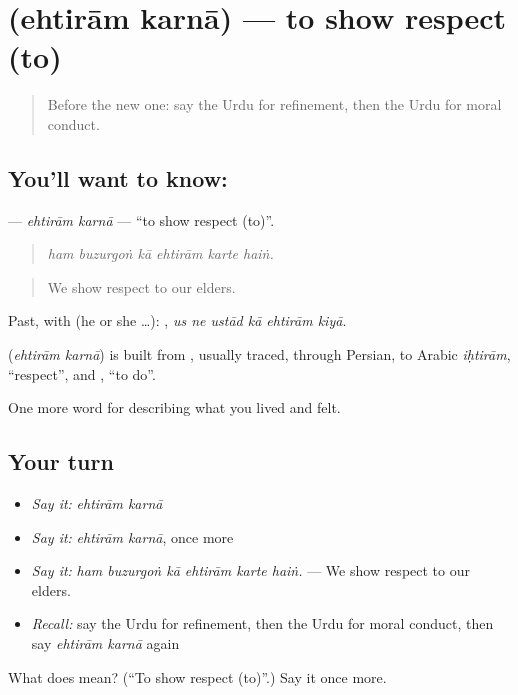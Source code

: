 \section[\texorpdfstring{\ur{احترام} \ur{کرنا} (ehtirām karnā)}{احترام کرنا (ehtirām karnā)}]{  (ehtirām karnā) — to show respect (to)}

\label{lesson:UR-C461-ehtiram-karna}



\begin{quote}
Before the new one: say the Urdu for refinement, then the Urdu for moral conduct.
\end{quote}

\subsection*{You'll want to know:  }
\textbf{ } — \emph{ehtirām karnā} — \textquotedblleft{}to show respect (to)\textquotedblright{}.

\begin{quote}
     
\end{quote}

\begin{quote}
\emph{ham buzurgoṅ kā ehtirām karte haiṅ.}
\end{quote}

\begin{quote}
We show respect to our elders.
\end{quote}

Past, with  (he or she …):      , \emph{us ne ustād kā ehtirām kiyā}.

\begin{cousinweb}
\textbf{ } (\emph{ehtirām karnā}) is built from \textbf{}, usually traced, through Persian, to Arabic \emph{iḥtirām}, \textquotedblleft{}respect\textquotedblright{}, and \textbf{}, \textquotedblleft{}to do\textquotedblright{}.
\end{cousinweb}

\begin{grammarlens}[title={What you've built}]
One more word for describing what you lived and felt.
\end{grammarlens}

\subsection*{Your turn}
\begin{itemize}
\raggedright
  \item \emph{Say it:} \emph{ehtirām karnā}
  \item \emph{Say it:} \emph{ehtirām karnā}, once more
  \item \emph{Say it:} \emph{ham buzurgoṅ kā ehtirām karte haiṅ.} — We show respect to our elders.
  \item \emph{Recall:} say the Urdu for refinement, then the Urdu for moral conduct, then say \emph{ehtirām karnā} again
\end{itemize}

\begin{tcolorbox}[breakable,colback=teal!4,colframe=teal!35!black,title={Before you move on}]
What does   mean? (\textquotedblleft{}To show respect (to)\textquotedblright{}.) Say it once more.
\end{tcolorbox}
